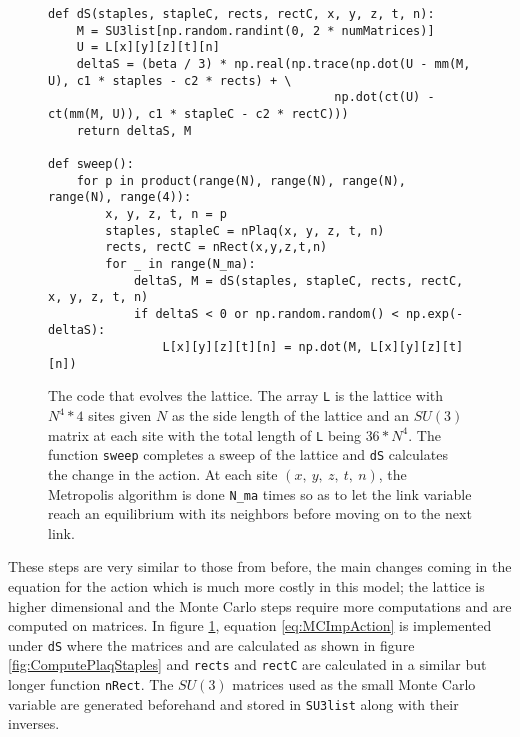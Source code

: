 \documentclass[11pt]{article}
\begin{document}
\begin{figure}[h]
\begin{lstlisting}
def dS(staples, stapleC, rects, rectC, x, y, z, t, n):
    M = SU3list[np.random.randint(0, 2 * numMatrices)]
    U = L[x][y][z][t][n]
    deltaS = (beta / 3) * np.real(np.trace(np.dot(U - mm(M, U), c1 * staples - c2 * rects) + \
                                        np.dot(ct(U) - ct(mm(M, U)), c1 * stapleC - c2 * rectC)))             
    return deltaS, M

def sweep():
    for p in product(range(N), range(N), range(N), range(N), range(4)):
        x, y, z, t, n = p
        staples, stapleC = nPlaq(x, y, z, t, n)
        rects, rectC = nRect(x,y,z,t,n)
        for _ in range(N_ma):
            deltaS, M = dS(staples, stapleC, rects, rectC, x, y, z, t, n)
            if deltaS < 0 or np.random.random() < np.exp(-deltaS):
                L[x][y][z][t][n] = np.dot(M, L[x][y][z][t][n])
\end{lstlisting}
\caption{The code that evolves the lattice. The array \texttt{L} is the lattice with $N^4*4$ sites given $N$ as the side length of the lattice and an $SU(3)$ matrix at each site with the total length of \texttt{L} being $36*N^4$. The function \texttt{sweep} completes a sweep of the lattice and \texttt{dS} calculates the change in the action. At each site $(x,\ y,\ z,\ t,\ n)$, the Metropolis algorithm is done \texttt{N\_ma} times so as to let the link variable reach an equilibrium with its neighbors before moving on to the next link.}
\label{fig:LQCDSweep}
\end{figure}

These steps are very similar to those from before, the main changes coming in the equation for the action which is much more costly in this model; the lattice is higher dimensional and the Monte Carlo steps require more computations and are computed on matrices. In figure \ref{fig:LQCDSweep}, equation \ref{eq:MCImpAction} is implemented under \texttt{dS} where the matrices  and  are calculated as shown in figure \ref{fig:ComputePlaqStaples} and \texttt{rects} and \texttt{rectC} are calculated in a similar but longer function \texttt{nRect}. The $SU(3)$ matrices used as the small Monte Carlo variable are generated beforehand and stored in \texttt{SU3list} along with their inverses.
\end{document}
